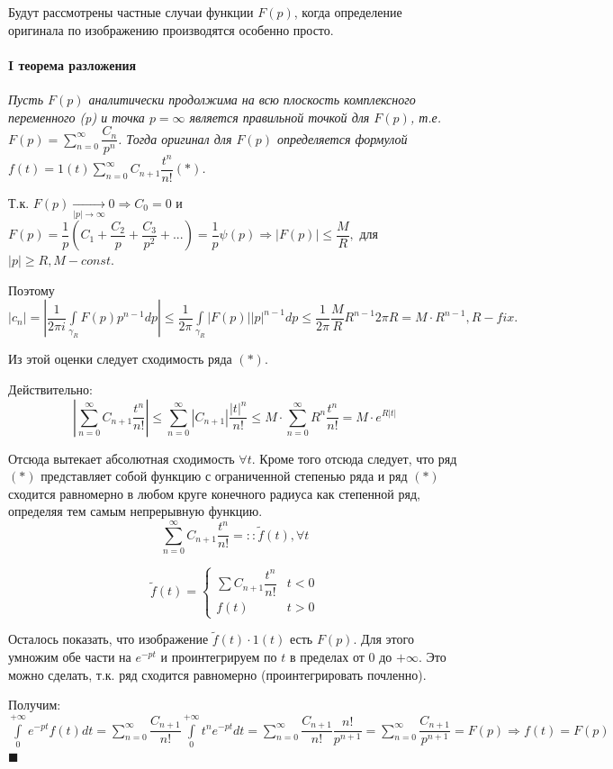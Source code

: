 \documentclass[a4paper, 12pt]{report}
\newenvironment{Proof}
{\par\noindent{\bf Доказательство.}}
{\hfill$\scriptstyle\blacksquare$}
\begin{document}
Будут рассмотрены частные случаи функции $F(p)$, когда определение оригинала по изображению производятся особенно просто.

\paragraph{I теорема разложения}
\textit{Пусть $F(p)$ аналитически продолжима на всю плоскость комплексного переменного (p) и точка $p = \infty$ является правильной точкой для $F(p)$, т.е. $F(p) = \sum\limits_{n=0}^{\infty}\dfrac{C_n}{p^n}$. Тогда оригинал для $F(p)$ определяется формулой $f(t) = 1(t)\sum\limits_{n=0}^{\infty}C_{n+1}\dfrac{t^n}{n!} (*)$.}
\begin{Proof}
    Т.к. $F(p) \xrightarrow[|p| \rightarrow \infty]{} 0 \Rightarrow C_0 = 0$ и $F(p) = \dfrac{1}{p}(C_1 + \dfrac{C_2}{p} + \dfrac{C_3}{p^2} + ...) = \dfrac{1}{p}\psi(p) \Rightarrow |F(p)| \leq \dfrac{M}{R}, $ для $ |p| \geq R, M - const.$

Поэтому $|c_n| = |\dfrac{1}{2\pi i} \int\limits_{\gamma_R} F(p)p^{n-1}dp| \leq \dfrac{1}{2 \pi}\int\limits_{\gamma_R} |F(p)||p|^{n-1}dp \leq \dfrac{1}{2 \pi}\dfrac{M}{R} R^{n-1} 2 \pi R = M \cdot R^{n-1}, R - fix.$

\par\bigskip
Из этой оценки следует сходимость ряда $(*)$.

Действительно: $$|\sum\limits_{n=0}^{\infty}C_{n+1}\dfrac{t^n}{n!}| \leq \sum\limits_{n=0}^{\infty}|C_{n+1}|\dfrac{|t|^n}{n!} \leq M \cdot \sum\limits_{n=0}^{\infty}R^{n}\dfrac{t^n}{n!} = M \cdot e^{R|t|}$$

Отсюда вытекает абсолютная сходимость $\forall t$. Кроме того отсюда следует, что ряд $(*)$ представляет собой функцию с ограниченной степенью ряда и ряд $(*)$ сходится равномерно в любом круге конечного радиуса как степенной ряд, определяя тем самым непрерывную функцию.
$$\sum\limits_{n=0}^{\infty}C_{n+1}\dfrac{t^n}{n!} =:: \widetilde{f}(t), \forall t$$

\begin{equation*}
\widetilde{f}(t) = 
 \begin{cases}
   \sum C_{n+1}\dfrac{t^n}{n!}&t < 0\\
   f(t) &t > 0
 \end{cases}
\end{equation*}

Осталось показать, что изображение $\widetilde{f}(t)\cdot 1(t)$ есть $F(p)$. Для этого умножим обе части на $e^{-pt}$ и проинтегрируем по $t$ в пределах от 0 до $+\infty$. Это можно сделать, т.к. ряд сходится равномерно (проинтегрировать почленно).

Получим: $\int\limits_{0}^{+\infty}e^{-pt}f(t)dt = \sum\limits_{n=0}^{\infty}\dfrac{C_{n+1}}{n!}\int\limits_{0}^{+\infty}t^ne^{-pt}dt = \sum\limits_{n=0}^{\infty}\dfrac{C_{n+1}}{n!}\dfrac{n!}{p^{n+1}} = \sum\limits_{n=0}^{\infty}\dfrac{C_{n+1}}{p^{n+1}} = F(p) \Rightarrow f(t) = F(p)$ 
\end{Proof}
\end{document}
